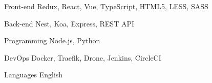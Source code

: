 

\begin{cvskills}


  \cvskill
  {Front-end} %
  {Redux, React, Vue, TypeScript, HTML5, LESS, SASS} %

  \cvskill
    {Back-end} %
    {Nest, Koa, Express, REST API} %

  \cvskill
    {Programming} %
    {Node.js, Python} %

\cvskill
  {DevOps} %
  {Docker, Traefik, Drone, Jenkins, CircleCI} %

  \cvskill
    {Languages} %
    {English} %

\end{cvskills}

